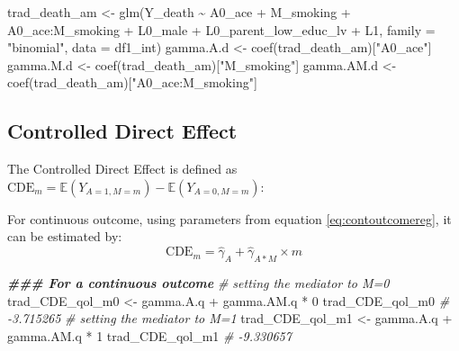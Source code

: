 \documentclass[
]{book}
\newenvironment{Shaded}{\begin{snugshade}}{\end{snugshade}}
\newcommand{\AttributeTok}[1]{\textcolor[rgb]{0.77,0.63,0.00}{#1}}
\newcommand{\CommentTok}[1]{\textcolor[rgb]{0.56,0.35,0.01}{\textit{#1}}}
\newcommand{\DecValTok}[1]{\textcolor[rgb]{0.00,0.00,0.81}{#1}}
\newcommand{\DocumentationTok}[1]{\textcolor[rgb]{0.56,0.35,0.01}{\textbf{\textit{#1}}}}
\newcommand{\FunctionTok}[1]{\textcolor[rgb]{0.00,0.00,0.00}{#1}}
\newcommand{\NormalTok}[1]{#1}
\newcommand{\OtherTok}[1]{\textcolor[rgb]{0.56,0.35,0.01}{#1}}
\newcommand{\SpecialCharTok}[1]{\textcolor[rgb]{0.00,0.00,0.00}{#1}}
\newcommand{\StringTok}[1]{\textcolor[rgb]{0.31,0.60,0.02}{#1}}
\begin{document}
\begin{Shaded}
\begin{Highlighting}[]
\NormalTok{trad\_death\_am }\OtherTok{\textless{}{-}} \FunctionTok{glm}\NormalTok{(Y\_death }\SpecialCharTok{\textasciitilde{}}\NormalTok{ A0\_ace }\SpecialCharTok{+}\NormalTok{ M\_smoking }\SpecialCharTok{+}\NormalTok{ A0\_ace}\SpecialCharTok{:}\NormalTok{M\_smoking }\SpecialCharTok{+}
\NormalTok{                       L0\_male }\SpecialCharTok{+}\NormalTok{ L0\_parent\_low\_educ\_lv }\SpecialCharTok{+}\NormalTok{ L1,}
                     \AttributeTok{family =} \StringTok{"binomial"}\NormalTok{,}
                     \AttributeTok{data =}\NormalTok{ df1\_int)}
\NormalTok{gamma.A.d }\OtherTok{\textless{}{-}} \FunctionTok{coef}\NormalTok{(trad\_death\_am)[}\StringTok{"A0\_ace"}\NormalTok{]}
\NormalTok{gamma.M.d }\OtherTok{\textless{}{-}} \FunctionTok{coef}\NormalTok{(trad\_death\_am)[}\StringTok{"M\_smoking"}\NormalTok{]}
\NormalTok{gamma.AM.d }\OtherTok{\textless{}{-}} \FunctionTok{coef}\NormalTok{(trad\_death\_am)[}\StringTok{"A0\_ace:M\_smoking"}\NormalTok{]}
\end{Highlighting}
\end{Shaded}

\hypertarget{trad2waycde}{%
\subsection{Controlled Direct Effect}\label{trad2waycde}}

The Controlled Direct Effect is defined as \(\text{CDE}_m = \mathbb{E}(Y_{A=1,M=m}) - \mathbb{E}(Y_{A=0,M=m})\):

For continuous outcome, using parameters from equation \eqref{eq:contoutcomereg}, it can be estimated by:
\[\text{CDE}_m = \hat{\gamma}_A + \hat{\gamma}_{A \ast M} \times m\]

\begin{Shaded}
\begin{Highlighting}[]
\DocumentationTok{\#\#\# For a continuous outcome}
\CommentTok{\# setting the mediator to M=0}
\NormalTok{trad\_CDE\_qol\_m0 }\OtherTok{\textless{}{-}}\NormalTok{ gamma.A.q }\SpecialCharTok{+}\NormalTok{ gamma.AM.q }\SpecialCharTok{*} \DecValTok{0}
\NormalTok{trad\_CDE\_qol\_m0}
\CommentTok{\# {-}3.715265}
\CommentTok{\# setting the mediator to M=1}
\NormalTok{trad\_CDE\_qol\_m1 }\OtherTok{\textless{}{-}}\NormalTok{ gamma.A.q }\SpecialCharTok{+}\NormalTok{ gamma.AM.q }\SpecialCharTok{*} \DecValTok{1}
\NormalTok{trad\_CDE\_qol\_m1}
\CommentTok{\# {-}9.330657}
\end{Highlighting}
\end{Shaded}
\end{document}
